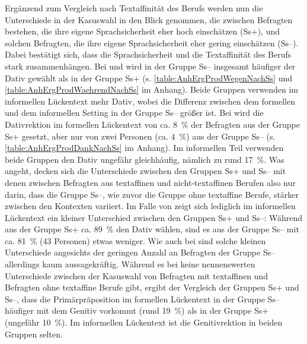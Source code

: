 Ergänzend zum Vergleich nach Textaffinität des Berufs werden nun die Unterschiede in der Kasuswahl in den Blick genommen, die zwischen Befragten bestehen, die ihre eigene Sprachsicherheit eher hoch einschätzen (Ss+), und solchen Befragten, die ihre eigene Sprachsicherheit eher gering einschätzen (Ss--). 
Dabei bestätigt sich, dass die Sprachsicherheit und die Textaffinität des Berufs stark zusammenhängen.
Bei \wegen{} und \waehrend{} wird in der Gruppe Ss-- insgesamt häufiger der Dativ gewählt als in der Gruppe Ss+ (s. \autoref{table:AnhErgProdWegenNachSs} und \autoref{table:AnhErgProdWaehrendNachSs} im Anhang). 
Beide Gruppen verwenden im informellen Lückentext mehr Dativ, wobei die Differenz zwischen dem formellen und dem informellen Setting in der Gruppe Ss-- größer ist. 
Bei \dank{} wird die Dativrektion im formellen Lückentext von ca. 8~\% der Befragten aus der Gruppe Ss+ gesetzt, aber nur von zwei Personen (ca. 4~\%) aus der Gruppe Ss-- (s. \autoref{table:AnhErgProdDankNachSs} im Anhang).
Im informellen Teil verwenden beide Gruppen den Dativ ungefähr gleichhäufig, nämlich zu rund 17~\%. 
Was \dank{} angeht, decken sich die Unterschiede zwischen den Gruppen Ss+ und Ss-- mit denen zwischen Befragten aus textaffinen und nicht-textaffinen Berufen also nur darin, dass die Gruppe Ss--, wie zuvor die Gruppe ohne textaffine Berufe, stärker zwischen den Kontexten variiert. 
Im Falle von \gegenueber{} zeigt sich lediglich im informellen Lückentext ein kleiner Unterschied zwischen den Gruppen Ss+ und Ss--:
Während aus der Gruppe Ss+ ca. 89~\% den Dativ wählen, sind es aus der Gruppe Ss-- mit ca. 81~\% (43 Personen) etwas weniger. 
Wie auch bei \dank{} sind solche kleinen Unterschiede angesichts der geringen Anzahl an Befragten der Gruppe Ss-- allerdings kaum aussagekräftig.
Während es bei  keine nennenswerten Unterschiede zwischen der Kasuswahl von Befragten mit textaffinen und Befragten ohne textaffine Berufe gibt, ergibt der Vergleich der Gruppen Ss+ und Ss--, dass die Primärpräposition im formellen Lückentext in der Gruppe Ss-- häufiger mit dem Genitiv vorkommt (rund 19~\%) als in der Gruppe Ss+ (ungefähr 10~\%).
Im informellen Lückentext ist die Genitivrektion in beiden Gruppen selten. 
